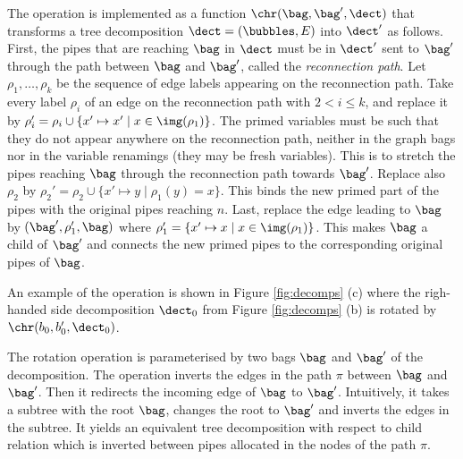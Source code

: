 {\begin{description}[leftmargin=2mm]
The operation is implemented as a function $\chr(\bag,\bag',\dect)$ that transforms a tree decomposition $\dect = (\bubbles,E)$ into $\dect'$ as follows.
First, the pipes that are reaching $\bag$ in $\dect$ must be in $\dect'$ sent to $\bag'$ through the path between $\bag$ and $\bag'$, called the \emph{reconnection path}.
Let $\rho_1,\ldots,\rho_k$ be the sequence of edge labels appearing on the reconnection path.
%
Take every label $\rho_i$ of an edge on the reconnection path with $2 < i \leq k$, and replace it by $\rho_i' = \rho_i \cup \{x'\mapsto x'\mid x\in \img(\rho_1)\}$.
The primed variables must be such that they do not appear anywhere on the reconnection path, neither in the graph bags nor in the variable renamings (they may be fresh variables).
%
This is to stretch the pipes reaching $\bag$ through the reconnection path towards $\bag'$.
%
Replace also $\rho_2$ by $\rho_2' = \rho_2\cup \{x'\mapsto y\mid \rho_1(y) = x\}$.
This binds the new primed part of the pipes with the original pipes reaching $n$.
%
Last, replace the edge leading to $\bag$ by $(\bag',\rho_1',\bag)$ where $\rho_1' = \{x'\mapsto x\mid x\in \img(\rho_1)\}$.
%
This makes $\bag$ a child of $\bag'$ and connects the new primed pipes to the corresponding original pipes of $\bag$.

An example of the operation is shown in Figure \ref{fig:decomps} (c)
where the righ-handed side decomposition $\dect_0$ from Figure \ref{fig:decomps} (b) is rotated by $\chr(b_0,b_0',\dect_0)$.

\item[Rotation.]
The rotation operation is parameterised by two bags $\bag$ and $\bag'$ of the decomposition. The operation inverts the edges in the path $\pi$ between $\bag$ and $\bag'$.
Then it redirects the incoming edge of $\bag$ to $\bag'$.
Intuitively, it takes a subtree with the root $\bag$, changes the root to $\bag'$ and inverts the edges in the subtree. 
It yields an equivalent tree decomposition with respect to child relation which is inverted between pipes allocated in the nodes of the path $\pi$.


\end{description}}
